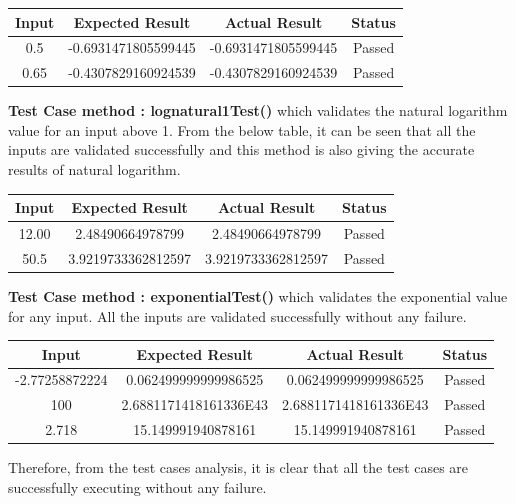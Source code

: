 \documentclass[12pt]{report}
\begin{document}
{\begin{center}
\begin{tabular}{ |c|c|c|c| } 
\hline
\textbf{Input} & \textbf{Expected Result} & \textbf{Actual Result} & \textbf{Status} \\
\hline
0.5 & -0.6931471805599445 & -0.6931471805599445 & Passed \\ 
\hline
0.65 & -0.4307829160924539 & -0.4307829160924539 & Passed \\ 
\hline
\end{tabular}
\end{center}
\noindent\newline\textbf{Test Case method : lognatural1Test()} which validates the natural logarithm value for an input above 1. From the below table, it can be seen that all the inputs are validated successfully and this method is also giving the accurate results of natural logarithm.\\

\begin{center}
\begin{tabular}{ |c|c|c|c| } 
\hline
\textbf{Input} & \textbf{Expected Result} & \textbf{Actual Result} & \textbf{Status} \\
\hline
12.00  & 2.48490664978799 & 2.48490664978799 & Passed \\ 
\hline
50.5 & 3.9219733362812597 & 3.9219733362812597 & Passed \\ 
\hline
\end{tabular}
\end{center}

\newline\noindent\textbf{Test Case method : exponentialTest()} which validates the exponential value for any input. All the inputs are validated successfully without any failure.\\

\begin{center}
\begin{tabular}{ |c|c|c|c| } 
\hline
\textbf{Input} & \textbf{Expected Result} & \textbf{Actual Result} & \textbf{Status} \\
\hline
-2.77258872224 & 0.062499999999986525 & 0.062499999999986525 & Passed \\ 
\hline
100 & 2.6881171418161336E43 & 2.6881171418161336E43 & Passed \\ 
\hline
2.718 & 15.149991940878161 & 15.149991940878161 & Passed \\ 
\hline
\end{tabular}
\end{center}
\newline
\newline
Therefore, from the test cases analysis, it is clear that all the test cases are successfully executing without any failure.


}
\end{document}
